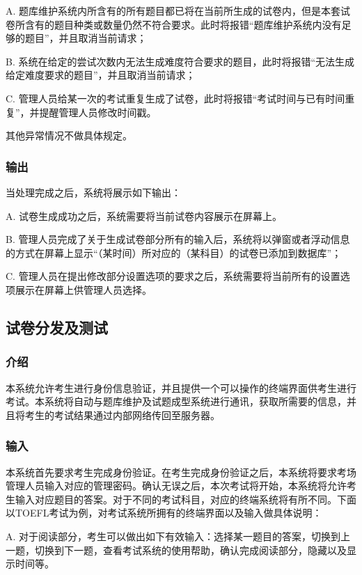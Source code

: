 A. 题库维护系统内所含有的所有题目都已将在当前所生成的试卷内，但是本套试卷所含有的题目种类或数量仍然不符合要求。此时将报错“题库维护系统内没有足够的题目”，并且取消当前请求；

B. 系统在给定的尝试次数内无法生成难度符合要求的题目，此时将报错“无法生成给定难度要求的题目”，并且取消当前请求；

C. 管理人员给某一次的考试重复生成了试卷，此时将报错“考试时间与已有时间重复”，并提醒管理人员修改时间戳。

其他异常情况不做具体规定。

\subsubsection{输出}
当处理完成之后，系统将展示如下输出：

A. 试卷生成成功之后，系统需要将当前试卷内容展示在屏幕上。

B. 管理人员完成了关于生成试卷部分所有的输入后，系统将以弹窗或者浮动信息的方式在屏幕上显示“（某时间）所对应的（某科目）的试卷已添加到数据库”；

C. 管理人员在提出修改部分设置选项的要求之后，系统需要将当前所有的设置选项展示在屏幕上供管理人员选择。


\subsection{试卷分发及测试}

\subsubsection{介绍}
本系统允许考生进行身份信息验证，并且提供一个可以操作的终端界面供考生进行考试。本系统将自动与题库维护及试题成型系统进行通讯，获取所需要的信息，并且将考生的考试结果通过内部网络传回至服务器。
	
\subsubsection{输入}
本系统首先要求考生完成身份验证。在考生完成身份验证之后，本系统将要求考场管理人员输入对应的管理密码。确认无误之后，本次考试将开始，本系统将允许考生输入对应题目的答案。对于不同的考试科目，对应的终端系统将有所不同。下面以TOEFL考试为例，对考试系统所拥有的终端界面以及输入做具体说明：

A. 对于阅读部分，考生可以做出如下有效输入：选择某一题目的答案，切换到上一题，切换到下一题，查看考试系统的使用帮助，确认完成阅读部分，隐藏以及显示时间等。

